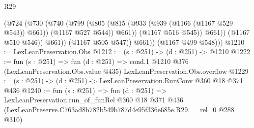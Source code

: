 \begin{lexlean}{R29}
\begin{coremodule}
                    (@724
                      (@730
                        (@740
                          (@799
                            (@805
                              (@815 (@933 (@939 (@1166 (@1167 @529 @543)) @661)) (@1167 @527 @544))
                              @661))
                          (@1167 @516 @545))
                        @661))
                    (@1167 @510 @546))
                  @661))
              (@1167 @505 @547))
            @661))
        (@1167 @499 @548)))
@1210 := LexLeanPreservation.Obs
@1212 := (s : @251) -> (d : @251) -> @1210
@1222 := fun (s : @251) =>
  fun (d : @251) =>
  cond.{1} @1210 @376 (LexLeanPreservation.Obs.value @435) LexLeanPreservation.Obs.overflow
@1229 := (s : @251) -> (d : @251) -> LexLeanPreservation.RunConv @360 @18 @371 @436
@1240 := fun (s : @251) =>
  fun (d : @251) =>
  LexLeanPreservation.run_of_funRel
    @360
    @18
    @371
    @436
    (LexLeanPreserve.C763ad8b782b549b787d4e95f336e685e.R29.__rel_0 @288 @310)
\end{coremodule}
\end{lexlean}
